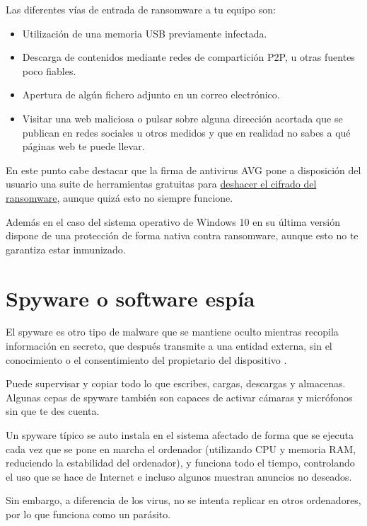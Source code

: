 \documentclass[
  spanish,
  a4paper,
  openany]{book}
\begin{document}
Las diferentes vías de entrada de ransomware a tu equipo son:

\begin{itemize}
\item
  Utilización de una memoria USB previamente infectada.
\item
  Descarga de contenidos mediante redes de compartición P2P, u otras fuentes poco fiables.
\item
  Apertura de algún fichero adjunto en un correo electrónico.
\item
  Visitar una web maliciosa o pulsar sobre alguna dirección acortada que se publican en redes sociales u otros medidos y que en realidad no sabes a qué páginas web te puede llevar.
\end{itemize}

En este punto cabe destacar que la firma de antivirus AVG pone a disposición del usuario una suite de herramientas gratuitas para \href{https://www.avg.com/es-es/ransomware-decryption-tools}{deshacer el cifrado del ransomware}, aunque quizá esto no siempre funcione.

Además en el caso del sistema operativo de Windows 10 en su última versión dispone de una protección de forma nativa contra ransomware, aunque esto no te garantiza estar inmunizado.

\hypertarget{spyware-o-software-espuxeda}{%
\section{Spyware o software espía}\label{spyware-o-software-espuxeda}}

El spyware es otro tipo de malware que se mantiene oculto mientras recopila información en secreto, que después transmite a una entidad externa, sin el conocimiento o el consentimiento del propietario del dispositivo \citep{AVAST-spyware}.

Puede supervisar y copiar todo lo que escribes, cargas, descargas y almacenas. Algunas cepas de spyware también son capaces de activar cámaras y micrófonos sin que te des cuenta.

Un spyware típico se auto instala en el sistema afectado de forma que se ejecuta cada vez que se pone en marcha el ordenador (utilizando CPU y memoria RAM, reduciendo la estabilidad del ordenador), y funciona todo el tiempo, controlando el uso que se hace de Internet e incluso algunos muestran anuncios no deseados.

Sin embargo, a diferencia de los virus, no se intenta replicar en otros ordenadores, por lo que funciona como un parásito.
\end{document}
